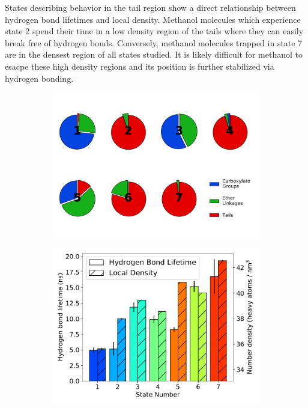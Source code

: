 \documentclass{article}
\begin{document}
  States describing behavior in the tail region show a direct relationship between 
  hydrogen bond lifetimes and local density. Methanol molecules which experience state 2 
  spend their time in a low density region of the tails where they can easily break free
  of hydrogen bonds. Conversely, methanol molecules trapped in state 7 are in the densest 
  region of all states studied. It is likely difficult for methanol to esacpe these high 
  density regions and its position is further stabilized via hydrogen bonding.
  
  \begin{figure}
  \centering
  \begin{subfigure}{0.54\textwidth}
  \includegraphics[width=\textwidth]{hbond_pi_charts.pdf}
  \caption{}\label{fig:hbond_pi_charts}
  \end{subfigure}
  \begin{subfigure}{0.45\textwidth}
  \includegraphics[width=\textwidth]{hbond_lifetimes_density_MET.pdf}

\end{subfigure}
\end{figure}
\end{document}
